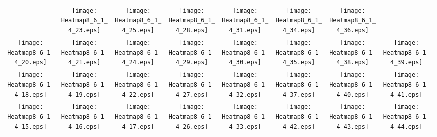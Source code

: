 \documentclass{standalone}
\begin{document}
\renewcommand{\arraystretch}{0}
\setlength{\tabcolsep}{0pt}
\begin{tabular}{ *8{c} }
 & \texttt{[image: Heatmap8\_6\_1\_4\_23.eps]} & \texttt{[image: Heatmap8\_6\_1\_4\_25.eps]} & \texttt{[image: Heatmap8\_6\_1\_4\_28.eps]} & \texttt{[image: Heatmap8\_6\_1\_4\_31.eps]} & \texttt{[image: Heatmap8\_6\_1\_4\_34.eps]} & \texttt{[image: Heatmap8\_6\_1\_4\_36.eps]} &  \\
\texttt{[image: Heatmap8\_6\_1\_4\_20.eps]} & \texttt{[image: Heatmap8\_6\_1\_4\_21.eps]} & \texttt{[image: Heatmap8\_6\_1\_4\_24.eps]} & \texttt{[image: Heatmap8\_6\_1\_4\_29.eps]} & \texttt{[image: Heatmap8\_6\_1\_4\_30.eps]} & \texttt{[image: Heatmap8\_6\_1\_4\_35.eps]} & \texttt{[image: Heatmap8\_6\_1\_4\_38.eps]} & \texttt{[image: Heatmap8\_6\_1\_4\_39.eps]} \\
\texttt{[image: Heatmap8\_6\_1\_4\_18.eps]} & \texttt{[image: Heatmap8\_6\_1\_4\_19.eps]} & \texttt{[image: Heatmap8\_6\_1\_4\_22.eps]} & \texttt{[image: Heatmap8\_6\_1\_4\_27.eps]} & \texttt{[image: Heatmap8\_6\_1\_4\_32.eps]} & \texttt{[image: Heatmap8\_6\_1\_4\_37.eps]} & \texttt{[image: Heatmap8\_6\_1\_4\_40.eps]} & \texttt{[image: Heatmap8\_6\_1\_4\_41.eps]} \\
\texttt{[image: Heatmap8\_6\_1\_4\_15.eps]} & \texttt{[image: Heatmap8\_6\_1\_4\_16.eps]} & \texttt{[image: Heatmap8\_6\_1\_4\_17.eps]} & \texttt{[image: Heatmap8\_6\_1\_4\_26.eps]} & \texttt{[image: Heatmap8\_6\_1\_4\_33.eps]} & \texttt{[image: Heatmap8\_6\_1\_4\_42.eps]} & \texttt{[image: Heatmap8\_6\_1\_4\_43.eps]} & \texttt{[image: Heatmap8\_6\_1\_4\_44.eps]} \\

\end{tabular}
\end{document}
